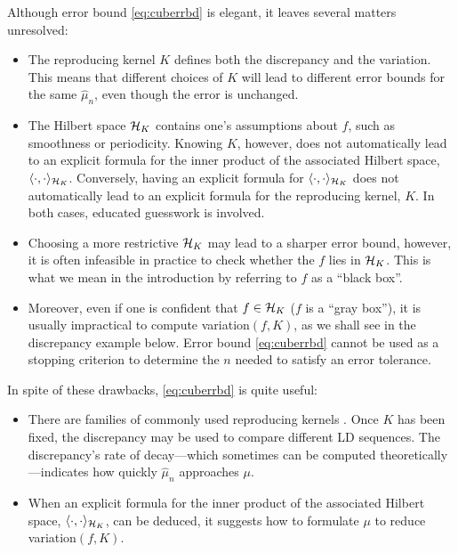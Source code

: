 \documentclass{svproc}
\begin{document}
Although error bound \eqref{eq:cuberrbd} is elegant, it leaves several matters unresolved:
\begin{itemize}
	\item The reproducing kernel $K$ defines both the discrepancy and the variation.  This means that different choices of $K$ will lead to different error bounds for the same $\hat{\mu}_n$, even though the error is unchanged.
	\item The Hilbert space ${\mathcal{H}}_K$ contains one's assumptions about $f$, such as smoothness or periodicity. Knowing $K$, however, does not automatically lead to an explicit formula for the inner product of the associated Hilbert space, $\langle \cdot, \cdot \rangle_{{\mathcal{H}}_K}$.  Conversely, having an explicit formula for  $\langle \cdot, \cdot \rangle_{{\mathcal{H}}_K}$ does not automatically lead to an explicit formula for the reproducing kernel, $K$.  In both cases, educated guesswork is involved.
	\item Choosing a more restrictive ${\mathcal{H}}_K$ may lead to a sharper error bound, however, it is often infeasible in practice to check whether the $f$ lies in ${\mathcal{H}}_K$.  This is what we mean in the introduction by referring to $f$ as a ``black box''.
	\item   Moreover, even if one is confident that $f \in {\mathcal{H}}_K$ ($f$ is a ``gray box''), it is usually impractical to compute variation$(f,K)$, as we shall see in the discrepancy example below.  Error bound \eqref{eq:cuberrbd} cannot be used as a stopping criterion to determine the $n$ needed to satisfy an error tolerance.
\end{itemize}
In spite of these drawbacks, \eqref{eq:cuberrbd} is quite useful:
\begin{itemize}
	\item There are families of commonly used reproducing kernels \cite{BerT-A04,Hic97a,Hic98b,Hic99b}. Once $K$ has been fixed, the discrepancy may be used to compare different LD sequences.  The discrepancy's rate of decay---which sometimes can be computed theoretically---indicates how quickly $\hat{\mu}_n$ approaches $\mu$.
	\item When an explicit formula for the inner product of the associated Hilbert space, $\langle \cdot, \cdot \rangle_{{\mathcal{H}}_K}$, can be deduced, it suggests how to formulate $\mu$ to reduce variation$(f,K)$.
\end{itemize}
\end{document}
